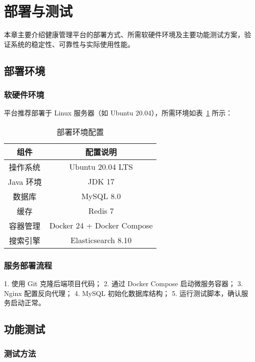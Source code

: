 \section{部署与测试}

本章主要介绍健康管理平台的部署方式、所需软硬件环境及主要功能测试方案，验证系统的稳定性、可靠性与实际使用性能。

\subsection{部署环境}

\subsubsection{软硬件环境}

平台推荐部署于 Linux 服务器（如 Ubuntu 20.04），所需环境如表~\ref{tab:env} 所示：

\begin{table}[H]
\centering
\caption{部署环境配置}
\label{tab:env}
\begin{tabular}{|c|c|}
\hline
组件 & 配置说明 \\
\hline
操作系统 & Ubuntu 20.04 LTS \\
Java 环境 & JDK 17 \\
数据库 & MySQL 8.0 \\
缓存 & Redis 7 \\
容器管理 & Docker 24 + Docker Compose \\
搜索引擎 & Elasticsearch 8.10 \\
\hline
\end{tabular}
\end{table}

\subsubsection{服务部署流程}

1. 使用 Git 克隆后端项目代码；
2. 通过 Docker Compose 启动微服务容器；
3. Nginx 配置反向代理；
4. MySQL 初始化数据库结构；
5. 运行测试脚本，确认服务启动正常。

\subsection{功能测试}

\subsubsection{测试方法}


